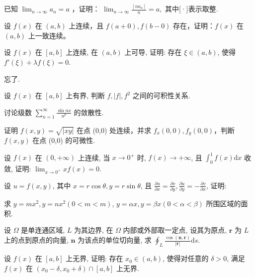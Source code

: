 已知 $\lim_{n\to \infty}a_n = a$ ，证明： $\lim_{n\to \infty}\frac{[na_n]}{n} = a,$ 其中[·]表示取整.\par
设 $f(x)$ 在 $(a, b)$ 上连续，且 $f(a + 0), f(b - 0)$ 存在，证明：$f(x)$ 在 $(a, b)$ 上一致连续。\par
设 $f(x)$ 在 $[a, b]$ 上连续, 在 $(a, b)$ 上可导, 证明: 存在 $\xi \in (a, b)$, 使得 $f'(\xi) + \lambda f(\xi) = 0$.\par
忘了.\par
设 $f(x)$ 在 $[a, b]$ 上有界, 判断 $f, |f|, f^2$ 之间的可积性关系.\par
讨论级数 $\sum_{n=1}^{\infty} \frac{\sin nx}{n^p}$ 的敛散性.\par
证明 $f(x, y) = \sqrt{|xy|}$ 在点 (0,0) 处连续，并求 $f_x(0,0), f_y(0,0)$，判断 $f(x, y)$ 在点 (0,0) 的可微性.\par
设 $f(x)$ 在 $(0, +\infty)$ 上连续, 当 $x \to 0^{+}$ 时, $f(x) \to +\infty$, 且 $\int_{0}^{1} f(x) \mathrm{d}x$ 收敛, 证明: $\lim_{x \to 0^{+}} x f(x) = 0$.\par
\par{}
设 $u = f(x, y)$, 其中 $x = r \cos \theta, y = r \sin \theta$, 且 $\frac{\partial u}{\partial x} = \frac{\partial v}{\partial y}, \frac{\partial u}{\partial y} = -\frac{\partial v}{\partial x}$, 证明:\par
\nopagebreak[4]
求 $y = mx^2, y = nx^2 (0 < m < m)$, $y = \alpha x, y = \beta x (0 < \alpha < \beta)$ 所围区域的面积.\par
设 $\Omega$ 是单连通区域, $L$ 为其边界, 在 $\Omega$ 内部或外部取一定点, 设其为原点, $\pmb{r}$ 为 $L$ 上的点到原点的向量, $\pmb{n}$ 为该点的单位切向量, 求 $\oint_{L} \frac{\cos(\pmb{n}, \pmb{r})}{|\pmb{r}|} \mathrm{d}s$.\par
设 $f(x)$ 在 $[a, b]$ 上无界, 证明: 存在 $x_0 \in (a, b)$, 使得对任意的 $\delta > 0$, 满足 $f(x)$ 在 $(x_0 - \delta, x_0 + \delta) \cap [a, b]$ 上无界.\par
